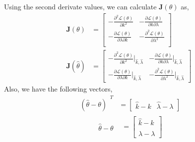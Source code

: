 \documentclass[11pt]{article}
\begin{document}
Using the second derivate values, we can calculate $\mathbf{J}(\theta)$ as,
\begin{equation}
  \nonumber
  \begin{aligned}
    \mathbf{J}(\theta) & = \begin{bmatrix}
      -\frac{\partial^{2} \mathcal{L}(\theta)}{\partial k^{2}} & -\frac{\partial \mathcal{L}(\theta)}{\partial k \partial \lambda}\\
      -\frac{\partial \mathcal{L}(\theta)}{\partial \lambda \partial k } & -\frac{\partial^{2} \mathcal{L}(\theta)}{\partial \lambda^{2}}\\
  \end{bmatrix}\\
  \mathbf{J}(\hat{\theta}) & = \begin{bmatrix}
    -\frac{\partial^{2} \mathcal{L}(\theta)}{\partial k^{2}} \rvert_{\hat{k}, \hat{\lambda}} & -\frac{\partial \mathcal{L}(\theta)}{\partial k \partial \lambda} \rvert_{\hat{k}, \hat{\lambda}}\\
    -\frac{\partial \mathcal{L}(\theta)}{\partial \lambda \partial k }\rvert_{\hat{k}, \hat{\lambda}} & -\frac{\partial^{2} \mathcal{L}(\theta)}{\partial \lambda^{2}}\rvert_{\hat{k}, \hat{\lambda}}
  \end{bmatrix}
  \end{aligned}
\end{equation}
Also, we have the following vectors,
\begin{equation}
  \begin{aligned}
    \nonumber
    \begin{matrix}
      (\hat{\theta} - \theta)
    \end{matrix}^{T} & = \begin{bmatrix}
      \hat{k} - k &
      \hat{\lambda} -\lambda
    \end{bmatrix}
  \end{aligned}
\end{equation}
\begin{equation}
  \begin{aligned}
    \nonumber
    \begin{matrix}
      \hat{\theta} - \theta
    \end{matrix} & = \begin{bmatrix}
      \hat{k} - k \\
      \hat{\lambda} -\lambda
    \end{bmatrix}
  \end{aligned}
\end{equation}
\end{document}
